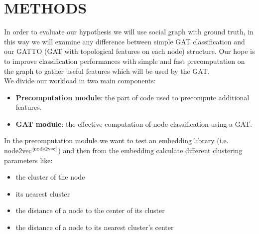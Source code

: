 \documentclass[12pt,conference]{ieeeconf} %
\begin{document}
\section{METHODS}
In order to evaluate our hypothesis we will use social graph with ground truth, in this way we will examine any difference between simple GAT classification and our GATTO (GAT with topological features on each node) structure. Our hope is to improve classification performances with simple and fast precomputation on the graph to gather useful features which will be used by the GAT. \\
We divide our workload in two main components:
\begin{itemize}
    \item\textbf{Precomputation module}: the part of code used to precompute additional features.
    \item\textbf{GAT module}: the effective computation of node classification using a GAT. 
\end{itemize}
In the precomputation module we want to test an embedding library (i.e. node2vec$^\text{\cite{node2vec}}$) and then from the embedding calculate different clustering parameters like:
\begin{itemize}
    \item the cluster of the node
    \item its nearest cluster
    \item the distance of a node to the center of its cluster
    \item the distance of a node to its nearest cluster's center
\end{itemize}

\end{document}
